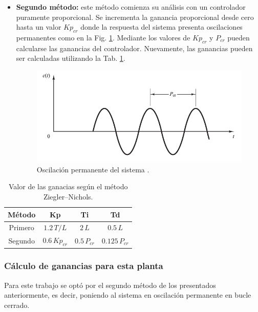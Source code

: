 \begin{itemize}
 \item \textbf{Segundo método:}
 este método comienza su análisis con un controlador puramente proporcional.
 Se incrementa  la ganancia proporcional desde cero hasta un valor $Kp_{cr} $
donde la respuesta del  sistema presenta oscilaciones permanentes como en la
Fig. \ref{fig:segundometodo}.
 Mediante los valores de $Kp_{cr} $ y $P_{cr}$ pueden calcularse las ganancias
del controlador.
Nuevamente, las ganancias pueden ser calculadas utilizando la Tab.
\ref{tab:valorganancias}.
\begin{figure}[ht]
 \centering
 \includegraphics[scale=0.5]{Cap4-ProgramacionPLC/images/segundometodo.png}
 \caption{Oscilación permanente del sistema \cite{bib:Ogata}.}
 \label{fig:segundometodo}
\end{figure}
\end{itemize}

\begin{table}[!t]
\renewcommand{\arraystretch}{1.3}
\centering
\begin{tabular}{c||c||c |c}
\hline
\bfseries Método & \bfseries Kp  & \bfseries Ti & \bfseries Td\\
\hline \hline
Primero &  $ 1.2 \, {T}/{L}$ & $2 \, L $ & $ 0.5 \, L $\\
\hline
Segundo &  $0.6 \,Kp_{cr}  $ & $ 0.5 \, P_{cr}$ & $0.125 \, P_{cr} $\\
\hline
\end{tabular}
\caption{Valor de las ganacias según el método Ziegler–Nichols.}
\label{tab:valorganancias}
\end{table}

\subsubsection{Cálculo de ganancias para esta planta}

Para este trabajo se optó por el segundo método de los presentados
anteriormente, es decir, poniendo al sistema en oscilación permanente en bucle
cerrado.

